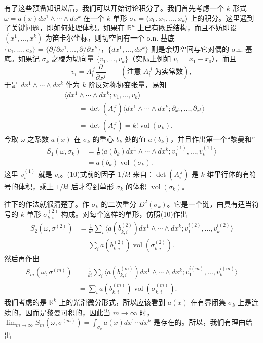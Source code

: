 有了这些预备知识以后，我们可以开始讨论积分了。我们首先考虑一个 $k$ 形式 $\omega=a(x)dx^1\wedge\cdots\wedge dx^k$ 在一个 $k$ 单形 $\sigma_k=\langle x_0,x_1,\ldots,x_k\rangle$ 上的积分。这里遇到了关键问题，即如何处理体积。如果在 $\mathbb R^n$ 上已有欧氏结构，而且不妨即设 $(x^1,\ldots,x^k)$ 为笛卡尔坐标，则切空间有一个 o.n. 基底 $\{e_1,\ldots,e_k\}=\{\partial/\partial x^1,\ldots,\partial/\partial x^k\}$，$\{dx^1,\ldots,dx^k\}$ 则是余切空间与它对偶的 o.n. 基底。如果记 $\sigma_k$ 之棱为切向量 $\{v_1,\ldots,v_k\}$（实际上例如 $v_1=x_1-x_0$），而且
\[
 v_i=A_i^{\ j}\frac{\partial}{\partial x^j}
 \qquad(\text{注意 }A_i^{\ j}\text{ 为实常数}),
\]
于是 $dx^1\wedge\cdots\wedge dx^k$ 作为 $k$ 阶反对称协变张量，易知
\begin{align*}
 &\langle dx^1\wedge\cdots\wedge dx^k;v_1,\ldots,v_k\rangle\\
 &\qquad=\det(A_i^{\ j})
 \langle dx^1\wedge\cdots\wedge dx^k;
 \partial_{x^1},\ldots,\partial_{x^k}\rangle\\
 &\qquad=\det(A_i^{\ j})=k!\operatorname{vol}(\sigma_k).
\end{align*}
今取 $\omega$ 之系数 $a(x)$ 在 $\sigma_k$ 的重心 $b_k$ 处的值 $a(b_k)$，并且作出第一个“黎曼和”
\begin{equation}
\begin{aligned}
 S_1(\omega,\sigma_k)
 &=\frac1{k!}\langle a(b_k)dx^1\wedge\cdots\wedge dx^k;
 v_1^{(1)},\ldots,v_k^{(1)}\rangle\\
 &=a(b_k)\operatorname{vol}(\sigma_k).
\end{aligned}
 \tag{10}
\end{equation}
这里 $v_i^{(1)}$ 就是 $v_i$。(10)式前的因子 $1/k!$ 来自：$\det(A_i^{\ j})$ 是 $k$ 维平行体的有符号的体积，乘上 $1/k!$ 后才得到单形 $\sigma_k$ 的体积 $\operatorname{vol}(\sigma_k)$。

往下的作法就很清楚了。作 $\sigma_k$ 的二次重分 $D^2(\sigma_k)$。它是一个链，由具有适当符号的 $k$ 单形 $\sigma_{k,i}^{(2)}$ 构成。对每个这样的单形，仿照(10)作出
\begin{align*}
 S_2(\omega,\sigma^{(2)})
 &=\frac1{k!}\sum_i\langle a(b_{k,i}^{(2)})dx^1\wedge\cdots\wedge dx^k;
 v_1^{i(2)},\ldots,v_k^{i(2)}\rangle\\
 &=\sum_i a(b_{k,i}^{(2)})\operatorname{vol}(\sigma_{k,i}^{(2)}).
\end{align*}
然后再作出
\begin{equation}
\begin{aligned}
 S_m(\omega,\sigma^{(m)})
 &=\frac1{k!}\sum_i\langle a(b_{k,i}^{(m)})dx^1\wedge\cdots\wedge dx^k;
 v_1^{i(m)},\ldots,v_k^{i(m)}\rangle\\
 &=\sum_i a(b_{k,i}^{(m)})\operatorname{vol}(\sigma_{k,i}^{(m)}).
\end{aligned}
 \tag{11}
\end{equation}
我们考虑的是 $\mathbb R^k$ 上的光滑微分形式，所以应该看到 $a(x)$ 在有界闭集 $\sigma_k$ 上是连续的，因而是黎曼可积的，因此当 $m\to\infty$ 时，$\lim_{m\to\infty}S_m(\omega,\sigma^{(m)})=\int_{\sigma_k}a(x)dx^1\cdots dx^k$ 是存在的。所以，我们有理由给出

